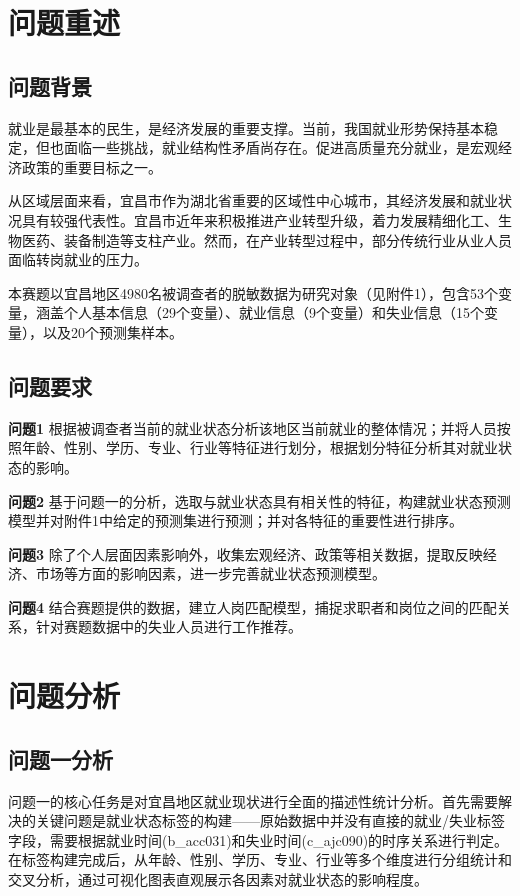 \documentclass[withoutpreface,bwprint]{cumcmthesis}
\begin{document}
\section{问题重述}
\subsection{问题背景}

就业是最基本的民生，是经济发展的重要支撑。当前，我国就业形势保持基本稳定，但也面临一些挑战，就业结构性矛盾尚存在。促进高质量充分就业，是宏观经济政策的重要目标之一。

从区域层面来看，宜昌市作为湖北省重要的区域性中心城市，其经济发展和就业状况具有较强代表性。宜昌市近年来积极推进产业转型升级，着力发展精细化工、生物医药、装备制造等支柱产业。然而，在产业转型过程中，部分传统行业从业人员面临转岗就业的压力。

本赛题以宜昌地区4980名被调查者的脱敏数据为研究对象（见附件1），包含53个变量，涵盖个人基本信息（29个变量）、就业信息（9个变量）和失业信息（15个变量），以及20个预测集样本。

\subsection{问题要求}

\textbf{问题1} 根据被调查者当前的就业状态分析该地区当前就业的整体情况；并将人员按照年龄、性别、学历、专业、行业等特征进行划分，根据划分特征分析其对就业状态的影响。

\textbf{问题2} 基于问题一的分析，选取与就业状态具有相关性的特征，构建就业状态预测模型并对附件1中给定的预测集进行预测；并对各特征的重要性进行排序。

\textbf{问题3} 除了个人层面因素影响外，收集宏观经济、政策等相关数据，提取反映经济、市场等方面的影响因素，进一步完善就业状态预测模型。

\textbf{问题4} 结合赛题提供的数据，建立人岗匹配模型，捕捉求职者和岗位之间的匹配关系，针对赛题数据中的失业人员进行工作推荐。

\section{问题分析}
\subsection{问题一分析}
问题一的核心任务是对宜昌地区就业现状进行全面的描述性统计分析。首先需要解决的关键问题是就业状态标签的构建——原始数据中并没有直接的就业/失业标签字段，需要根据就业时间(b\_acc031)和失业时间(c\_ajc090)的时序关系进行判定。在标签构建完成后，从年龄、性别、学历、专业、行业等多个维度进行分组统计和交叉分析，通过可视化图表直观展示各因素对就业状态的影响程度。
\end{document}
